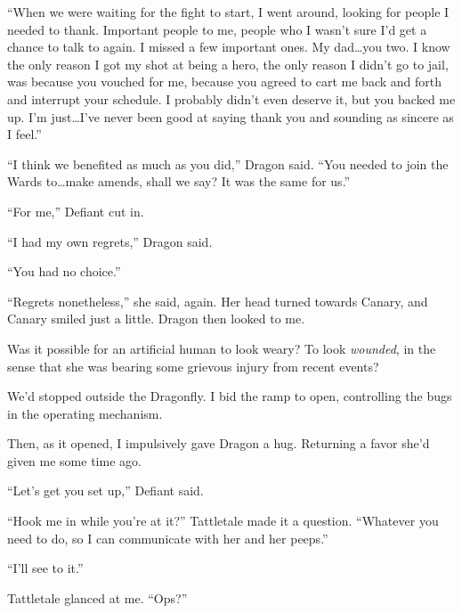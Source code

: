 ``When we were waiting for the fight to start, I went around, looking for people I needed to thank.  Important people to me, people who I wasn't sure I'd get a chance to talk to again.  I missed a few important ones.  My dad\ldots you two.  I know the only reason I got my shot at being a hero, the only reason I didn't go to jail, was because you vouched for me, because you agreed to cart me back and forth and interrupt your schedule.  I probably didn't even deserve it, but you backed me up.  I'm just\ldots I've never been good at saying thank you and sounding as sincere as I feel.''



``I think we benefited as much as you did,'' Dragon said.  ``You needed to join the Wards to\ldots make amends, shall we say?  It was the same for us.''



``For me,'' Defiant cut in.



``I had my own regrets,'' Dragon said.



``You had no choice.''



``Regrets nonetheless,'' she said, again.  Her head turned towards Canary, and Canary smiled just a little.  Dragon then looked to me.



Was it possible for an artificial human to look weary?  To look \emph{wounded}, in the sense that she was bearing some grievous injury from recent events?



We'd stopped outside the Dragonfly.  I bid the ramp to open, controlling the bugs in the operating mechanism.



Then, as it opened, I impulsively gave Dragon a hug.  Returning a favor she'd given me some time ago.



``Let's get you set up,'' Defiant said.



``Hook me in while you're at it?'' Tattletale made it a question.  ``Whatever you need to do, so I can communicate with her and her peeps.''



``I'll see to it.''



Tattletale glanced at me.  ``Ops?''




